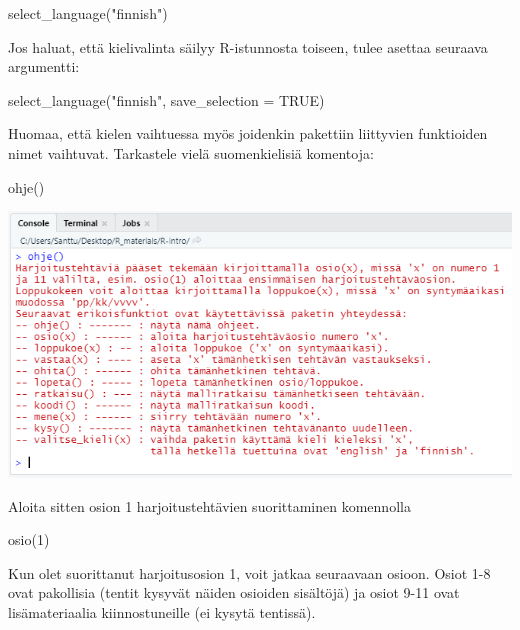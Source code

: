 \documentclass[
]{book}
\newenvironment{Shaded}{\begin{snugshade}}{\end{snugshade}}
\newcommand{\AttributeTok}[1]{\textcolor[rgb]{0.77,0.63,0.00}{#1}}
\newcommand{\ConstantTok}[1]{\textcolor[rgb]{0.00,0.00,0.00}{#1}}
\newcommand{\DecValTok}[1]{\textcolor[rgb]{0.00,0.00,0.81}{#1}}
\newcommand{\FunctionTok}[1]{\textcolor[rgb]{0.00,0.00,0.00}{#1}}
\newcommand{\NormalTok}[1]{#1}
\newcommand{\StringTok}[1]{\textcolor[rgb]{0.31,0.60,0.02}{#1}}
\begin{document}
\begin{Shaded}
\begin{Highlighting}[]
\FunctionTok{select\_language}\NormalTok{(}\StringTok{"finnish"}\NormalTok{)}
\end{Highlighting}
\end{Shaded}

Jos haluat, että kielivalinta säilyy R-istunnosta toiseen, tulee asettaa seuraava argumentti:

\begin{Shaded}
\begin{Highlighting}[]
\FunctionTok{select\_language}\NormalTok{(}\StringTok{"finnish"}\NormalTok{, }\AttributeTok{save\_selection =} \ConstantTok{TRUE}\NormalTok{)}
\end{Highlighting}
\end{Shaded}

Huomaa, että kielen vaihtuessa myös joidenkin pakettiin liittyvien funktioiden nimet vaihtuvat.
Tarkastele vielä suomenkielisiä komentoja:

\begin{Shaded}
\begin{Highlighting}[]
\FunctionTok{ohje}\NormalTok{()}
\end{Highlighting}
\end{Shaded}

\includegraphics{files/00-start/Rcourse_package_info.png}

Aloita sitten osion 1 harjoitustehtävien suorittaminen komennolla

\begin{Shaded}
\begin{Highlighting}[]
\FunctionTok{osio}\NormalTok{(}\DecValTok{1}\NormalTok{)}
\end{Highlighting}
\end{Shaded}

Kun olet suorittanut harjoitusosion 1, voit jatkaa seuraavaan osioon. Osiot 1-8 ovat pakollisia (tentit kysyvät näiden osioiden sisältöjä) ja osiot 9-11 ovat lisämateriaalia kiinnostuneille (ei kysytä tentissä).
\end{document}

